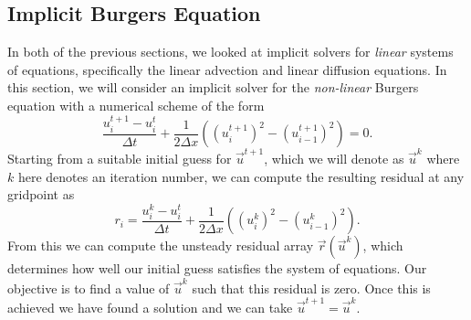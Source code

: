 \subsection{Implicit Burgers Equation}
In both of the previous sections, we looked at implicit solvers for {\it linear} systems of equations, specifically the linear advection and linear diffusion equations. In this section, we will consider an implicit solver for the {\it non-linear} Burgers equation with a numerical scheme of the form
\begin{equation}
	\frac{u_i^{t+1} - u_{i}^t}{\Delta t} + \frac{1}{2\Delta x}\left( \left(u_i^{t+1} \right)^2 - \left( u_{i-1}^{t+1} \right)^2 \right) =  0.
\end{equation}
Starting from a suitable initial guess for $\vec{u}^{t+1}$, which we will denote as $\vec{u}^{k}$ where $k$ here denotes an iteration number, we can compute the resulting residual at any gridpoint as
\begin{equation}
	r_i = \frac{u_i^{k} - u_{i}^t}{\Delta t} + \frac{1}{2\Delta x}\left( \left(u_i^{k} \right)^2 - \left( u_{i-1}^{k} \right)^2 \right).
\end{equation}
From this we can compute the unsteady residual array $\vec{r}(\vec{u}^{k})$, which determines how well our initial guess satisfies the system of equations. Our objective is to find a value of $\vec{u}^{k}$ such that this residual is zero. Once this is achieved we have found a solution and we can take $\vec{u}^{t+1} = \vec{u}^{k}$.

